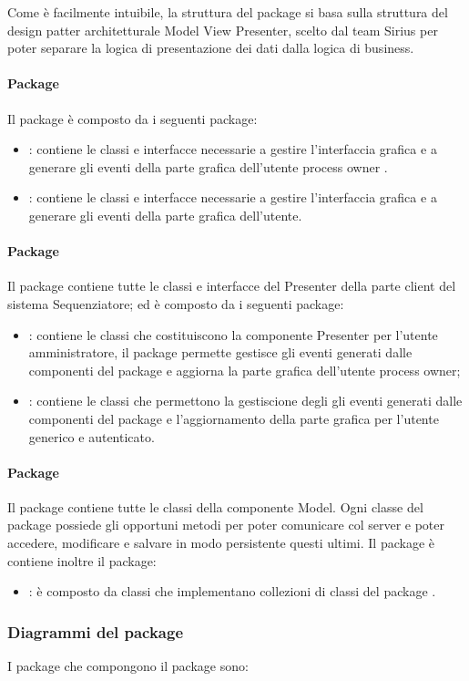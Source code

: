Come è facilmente intuibile, la struttura del package \client{} si basa sulla struttura del design patter
architetturale Model View Presenter, scelto dal team Sirius per poter separare la logica di presentazione dei dati dalla logica di business.\\

\paragraph{Package \view{}}
Il package \view{} è composto da i seguenti package:
\begin{itemize}
	\item \viewAdmin{}: contiene le classi e interfacce necessarie a gestire 
l’interfaccia grafica e a generare gli eventi della parte grafica dell'utente process owner .
	\item \viewUser{}: contiene le classi e interfacce necessarie a gestire l’interfaccia
grafica e a generare gli eventi della parte grafica dell’utente.
\end{itemize}
\paragraph{Package \logic{}}
Il package \logic{} contiene tutte le classi e interfacce del Presenter della 
parte client del sistema Sequenziatore; ed è composto da i seguenti package:
\begin{itemize}
	\item \logicAdmin{}: contiene le classi che costituiscono la componente Presenter
per l’utente amministratore, il package \logicAdmin{} permette gestisce gli eventi generati dalle componenti del package \viewAdmin{} e 
aggiorna la parte grafica dell'utente process owner;
	\item \logicUser{}: contiene le classi che permettono la gestiscione degli gli eventi generati dalle componenti del package
\viewUser{} e l'aggiornamento della parte grafica per l'utente generico e autenticato.
\end{itemize}
\paragraph{Package \model{}}
Il package \model{} contiene tutte le classi della componente Model. Ogni classe del package \model{} possiede gli opportuni metodi per poter
comunicare col server e poter accedere, modificare e salvare in modo persistente questi ultimi.
Il package è contiene inoltre il package:
\begin{itemize}
	\item \collection{}: è composto da classi che implementano collezioni di classi del package \model{}.
\end{itemize} 


\subsubsection{Diagrammi del package \server{}}
I package che compongono il package \server{} sono:


